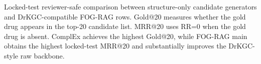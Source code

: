 \caption{Locked-test reviewer-safe comparison between structure-only candidate generators and DrKGC-compatible FOG-RAG rows. Gold@20 measures whether the gold drug appears in the top-20 candidate list. MRR@20 uses RR=0 when the gold drug is absent. ComplEx achieves the highest Gold@20, while FOG-RAG main obtains the highest locked-test MRR@20 and substantially improves the DrKGC-style raw backbone.}
